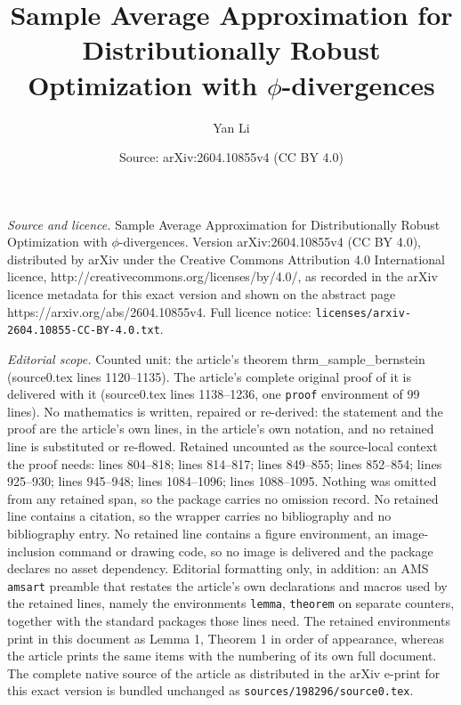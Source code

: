 \documentclass[10pt,a4paper]{amsart}
\title{Sample Average Approximation for Distributionally Robust Optimization with $\phi$-divergences}
\author{Yan Li}
\date{Source: arXiv:2604.10855v4 (CC BY 4.0)}
\begin{document}
\maketitle

\noindent\emph{Source and licence.} Sample Average Approximation for Distributionally Robust Optimization with $\phi$-divergences. Version arXiv:2604.10855v4 (CC BY 4.0), distributed by arXiv under the Creative Commons Attribution 4.0 International licence, http://creativecommons.org/licenses/by/4.0/, as recorded in the arXiv licence metadata for this exact version and shown on the abstract page https://arxiv.org/abs/2604.10855v4. Full licence notice: \texttt{licenses/arxiv-2604.10855-CC-BY-4.0.txt}.\par\smallskip

\noindent\textit{Editorial scope.} Counted unit: the article's theorem thrm\_sample\_bernstein (source0.tex lines 1120--1135). The article's complete original proof of it is delivered with it (source0.tex lines 1138--1236, one \texttt{proof} environment of 99 lines). No mathematics is written, repaired or re-derived: the statement and the proof are the article's own lines, in the article's own notation, and no retained line is substituted or re-flowed.  Retained uncounted as the source-local context the proof needs: lines 804--818; lines 814--817; lines 849--855; lines 852--854; lines 925--930; lines 945--948; lines 1084--1096; lines 1088--1095.  Nothing was omitted from any retained span, so the package carries no omission record.  No retained line contains a citation, so the wrapper carries no bibliography and no bibliography entry.  No retained line contains a figure environment, an image-inclusion command or drawing code, so no image is delivered and the package declares no asset dependency.  Editorial formatting only, in addition: an AMS \texttt{amsart} preamble that restates the article's own declarations and macros used by the retained lines, namely the environments \texttt{lemma}, \texttt{theorem} on separate counters, together with the standard packages those lines need.  The retained environments print in this document as Lemma 1, Theorem 1 in order of appearance, whereas the article prints the same items with the numbering of its own full document.  The complete native source of the article as distributed in the arXiv e-print for this exact version is bundled unchanged as \texttt{sources/198296/source0.tex}.
\end{document}
